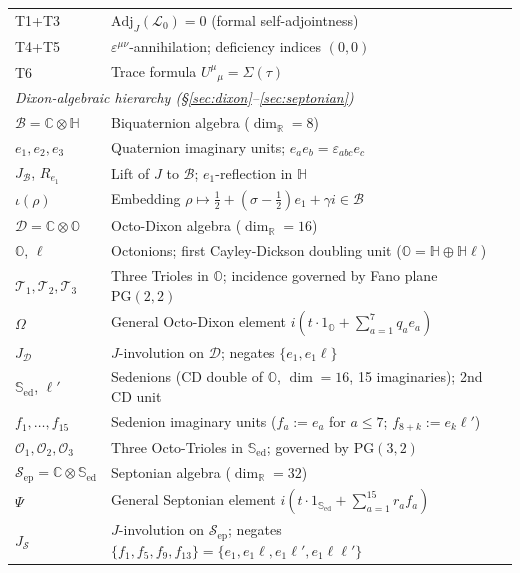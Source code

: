\documentclass[12pt,a4paper]{article}
\theoremstyle{remark}
\begin{document}
\begin{longtable}{p{3.2cm}p{11cm}}
T1+T3 & $\mathrm{Adj}_J(\mathcal{L}_0)=0$ (formal self-adjointness)\\
T4+T5 & $\varepsilon^{\mu\nu}$-annihilation; deficiency indices $(0,0)$\\
T6 & Trace formula $U^\mu{}_\mu=\Sigma(\tau)$\\[4pt]
%
\multicolumn{2}{l}{\textit{Dixon-algebraic hierarchy (\S\ref{sec:dixon}--\ref{sec:septonian})}}\\[2pt]
$\mathcal{B}=\mathbb{C}\otimes\mathbb{H}$ & Biquaternion algebra ($\dim_\mathbb{R}=8$)\\
$e_1,e_2,e_3$ & Quaternion imaginary units; $e_ae_b=\varepsilon_{abc}e_c$\\
$J_{\mathcal{B}}$, $R_{e_1}$ & Lift of $J$ to $\mathcal{B}$; $e_1$-reflection in $\mathbb{H}$\\
$\iota(\rho)$ & Embedding $\rho\mapsto\tfrac{1}{2}+(\sigma-\tfrac{1}{2})e_1+\gamma i\in\mathcal{B}$\\
$\mathcal{D}=\mathbb{C}\otimes\mathbb{O}$ & Octo-Dixon algebra ($\dim_\mathbb{R}=16$)\\
$\mathbb{O}$, $\ell$ & Octonions; first Cayley-Dickson doubling unit ($\mathbb{O}=\mathbb{H}\oplus\mathbb{H}\ell$)\\
$\mathcal{T}_1,\mathcal{T}_2,\mathcal{T}_3$ & Three Trioles in $\mathbb{O}$; incidence governed by Fano plane $\mathrm{PG}(2,2)$\\
$\Omega$ & General Octo-Dixon element $i(t\cdot1_\mathbb{O}+\sum_{a=1}^7 q_ae_a)$\\
$J_{\mathcal{D}}$ & $J$-involution on $\mathcal{D}$; negates $\{e_1,e_1\ell\}$\\
$\mathbb{S}_{\mathrm{ed}}$, $\ell'$ & Sedenions (CD double of $\mathbb{O}$, $\dim=16$, 15 imaginaries); 2nd CD unit\\
$f_1,\ldots,f_{15}$ & Sedenion imaginary units ($f_a:=e_a$ for $a\le7$; $f_{8+k}:=e_k\ell'$)\\
$\mathcal{O}_1,\mathcal{O}_2,\mathcal{O}_3$ & Three Octo-Trioles in $\mathbb{S}_{\mathrm{ed}}$; governed by $\mathrm{PG}(3,2)$\\
$\mathcal{S}_{\mathrm{ep}}=\mathbb{C}\otimes\mathbb{S}_{\mathrm{ed}}$ & Septonian algebra ($\dim_\mathbb{R}=32$)\\
$\Psi$ & General Septonian element $i(t\cdot1_{\mathbb{S}_{\mathrm{ed}}}+\sum_{a=1}^{15}r_af_a)$\\
$J_{\mathcal{S}}$ & $J$-involution on $\mathcal{S}_{\mathrm{ep}}$; negates $\{f_1,f_5,f_9,f_{13}\}=\{e_1,e_1\ell,e_1\ell',e_1\ell\ell'\}$\\

\end{longtable}
\end{document}
